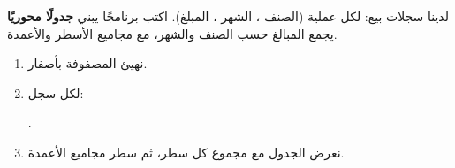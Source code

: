 \begin{statement}
لدينا سجلات بيع: لكل عملية (الصنف ، الشهر ، المبلغ). اكتب برنامجًا يبني \textbf{جدولًا محوريًا}  يجمع المبالغ حسب الصنف والشهر، مع مجاميع الأسطر والأعمدة.
\end{statement}
\begin{stepsbox}\begin{enumerate}
\item نهيئ المصفوفة بأصفار.
\item لكل سجل: \par{\centering\small{}\par}.
\item نعرض الجدول مع مجموع كل سطر، ثم سطر مجاميع الأعمدة.
\end{enumerate}\end{stepsbox}
